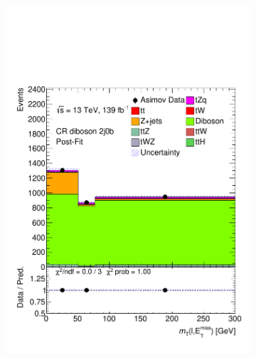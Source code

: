 \begin{figure}[!h]
\begin{subfigure}[b]{0.33\linewidth}
    \includegraphics[width=\textwidth]{ubonn-thesis/Chapters/Chapters_07/Figure/Asmiov/CR_2j0b_postFit.pdf} 
    \caption{}
  \end{subfigure} 
  \begin{subfigure}[b]{0.33\linewidth}
    \centering

\end{subfigure}
\end{figure}
